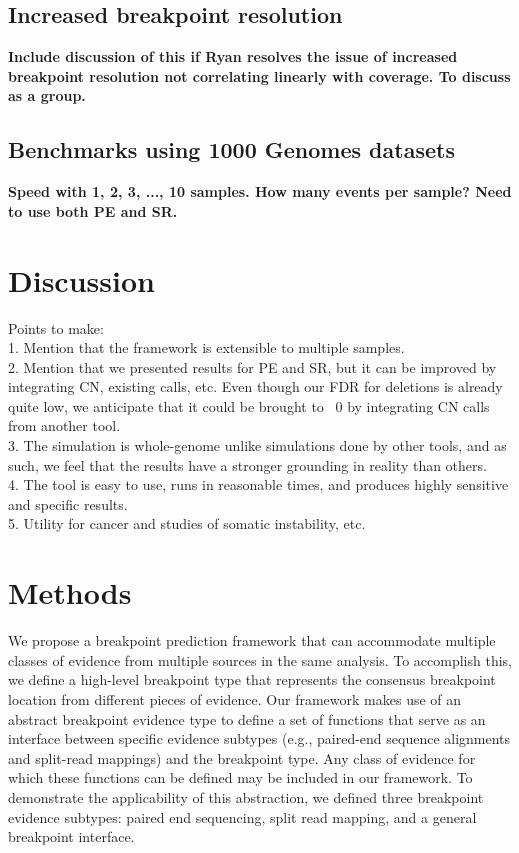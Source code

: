 \documentclass[11pt]{article}
\begin{document}
\subsection{Increased breakpoint resolution}
\textbf{Include discussion of this if Ryan resolves the issue of increased
breakpoint resolution not correlating linearly with coverage.  To discuss as a 
group.}


\subsection{Benchmarks using 1000 Genomes datasets}
\textbf{Speed with 1, 2, 3, ..., 10 samples.  How many events per sample?
Need to use both PE and SR.}



\section{Discussion}
Points to make:\\
1. Mention that the framework is extensible to multiple samples. \\
2. Mention that we presented results for PE and SR, but it can be 
improved by integrating CN, existing calls, etc.  Even though our FDR for 
deletions is already quite low, we anticipate that it could be brought to ~0
by integrating CN calls from another tool.\\
3. The simulation is whole-genome unlike simulations done by other tools, 
and as such, we feel that the results have a stronger grounding in reality
than others.\\
4. The tool is easy to use, runs in reasonable times, and produces highly
sensitive and specific results.\\
5. Utility for cancer and studies of somatic instability, etc.\\



\section{Methods}

We propose a breakpoint prediction framework that can accommodate multiple
classes of evidence from multiple sources in the same analysis.  To accomplish
this, we define a high-level breakpoint type that represents the consensus
breakpoint location from different pieces of evidence.  Our framework makes use
of an abstract breakpoint evidence type to define a set of functions that serve
as an interface between specific evidence subtypes (e.g., paired-end sequence
alignments and split-read mappings) and the breakpoint type.  Any class of
evidence for which these functions can be defined may be included in our
framework.  To demonstrate the applicability of this abstraction, we defined
three breakpoint evidence subtypes: paired end sequencing, split read mapping,
and a general breakpoint interface. 
\end{document}
